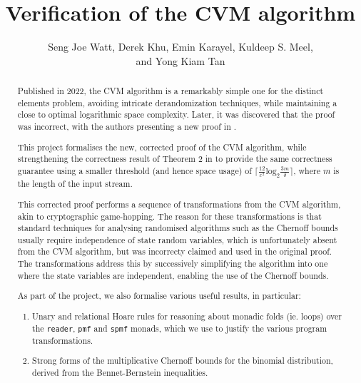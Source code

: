 \documentclass[11pt, a4paper]{report}
\begin{document}
\title{Verification of the CVM algorithm}

\author{
  Seng Joe Watt,
  Derek Khu,
  Emin Karayel,
  Kuldeep S. Meel,
  \\
  and Yong Kiam Tan
}

\maketitle

\begin{abstract}
  Published in 2022, the CVM algorithm \cite{cvm_2022} is a remarkably simple
  one for the distinct elements problem, avoiding intricate derandomization
  techniques, while maintaining a close to optimal logarithmic space complexity.
  Later, it was discovered that the proof was incorrect, with the authors
  presenting a new proof in \cite{cvm_2023}.

  This project formalises the new, corrected proof of the CVM algorithm, while
  strengthening the correctness result of Theorem 2 in \cite{cvm_2023} to provide
  the same correctness guarantee using a smaller threshold
  (and hence space usage) of
  $\lceil \frac{12}{\varepsilon^2} \text{log}_2 \frac{3m}{\delta} \rceil$,
  where $m$ is the length of the input stream.

  This corrected proof performs a sequence of transformations from the CVM
  algorithm, akin to cryptographic game-hopping.
  The reason for these transformations is that standard techniques for analysing
  randomised algorithms such as the Chernoff bounds usually require independence
  of state random variables, which is unfortunately absent from the CVM
  algorithm, but was incorrecty claimed and used in the original proof.
  The transformations address this by successively simplifying the
  algorithm into one where the state variables are independent, enabling
  the use of the Chernoff bounds.

  As part of the project, we also formalise various useful results, in particular:
  \begin{enumerate}
    \item Unary and relational Hoare rules for reasoning about monadic folds
    (ie. loops) over the \texttt{reader}, \texttt{pmf} and \texttt{spmf} monads,
    which we use to justify the various program transformations.

    \item Strong forms of the multiplicative Chernoff bounds for the binomial
    distribution, derived from the Bennet-Bernstein inequalities.
  \end{enumerate}
\end{abstract}
\end{document}
